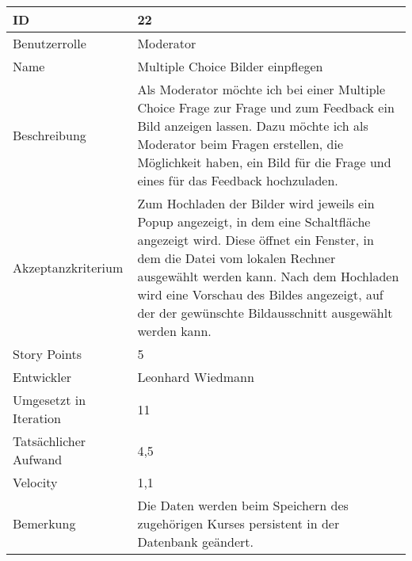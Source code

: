 \begin{tabularx}{\textwidth}{|p{}|X|}
	\hline
	ID & 22\\
	\hline
	Benutzerrolle & Moderator\\
	\hline
	Name & Multiple Choice Bilder einpflegen\\
	\hline
	Beschreibung & Als Moderator möchte ich bei einer Multiple Choice Frage zur Frage und zum Feedback ein Bild anzeigen lassen. Dazu möchte ich als Moderator beim Fragen erstellen, die Möglichkeit haben, ein Bild für die Frage und eines für das Feedback hochzuladen. \\
	\hline
	Akzeptanzkriterium & Zum Hochladen der Bilder wird jeweils ein Popup angezeigt, in dem eine Schaltfläche angezeigt wird. Diese öffnet ein Fenster, in dem die Datei vom lokalen Rechner ausgewählt werden kann. Nach dem Hochladen wird eine Vorschau des Bildes angezeigt, auf der der gewünschte Bildausschnitt ausgewählt werden kann.\\
	\hline
	Story Points & 5 \\
	\hline
	Entwickler &  Leonhard Wiedmann\\
	\hline
	Umgesetzt in Iteration & 11\\
	\hline
	Tatsächlicher Aufwand & 4,5\\
	\hline
	Velocity & 1,1\\
	\hline
	Bemerkung & Die Daten werden beim Speichern des zugehörigen Kurses persistent in der Datenbank geändert.\\
	\hline
\end{tabularx}
\vspace{20pt}
